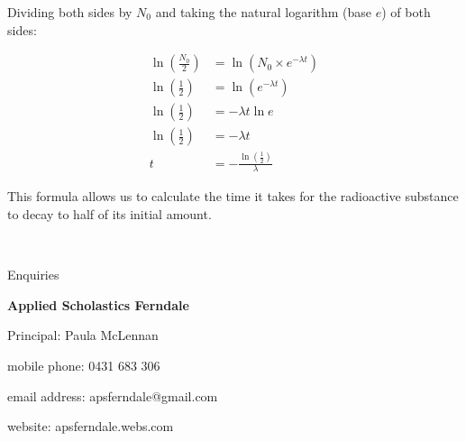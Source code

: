 \documentclass{article}
\begin{document}
\newpage

Dividing both sides by $N_0$ and taking the natural logarithm (base $e$) of both sides:

\begin{align*}
\ln{\left(\frac{N_0}{2}\right)} &= \ln{(N_0 \times e^{-\lambda t})} \\
\ln{\left(\frac{1}{2}\right)} &= \ln{(e^{-\lambda t})} \\
\ln{\left(\frac{1}{2}\right)} &= -\lambda t \ln{e} \\
\ln{\left(\frac{1}{2}\right)} &= -\lambda t \\
t &= -\frac{\ln{\left(\frac{1}{2}\right)}}{\lambda}
\end{align*}

This formula allows us to calculate the time it takes for the radioactive substance to decay to half of its initial amount.

\newpage
\
\newpage
\
\newpage
\
\newpage
\
\newpage
\
\newpage
\
\newpage
\
\newpage
\
\newpage
\
\newpage
\
\newpage
\
\newpage
\
\newpage
\

\begin{center}
\linespread{2}\large

Enquiries

\textbf{Applied Scholastics Ferndale}

Principal: Paula McLennan

mobile phone: 0431 683 306

email address: apsferndale@gmail.com

website: apsferndale.webs.com
\end{center}
\end{document}
